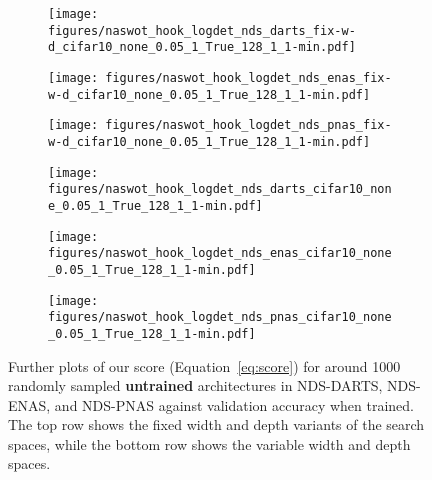 \documentclass{article}
\begin{document}
\begin{figure}[!b]
\vspace{-2cm}

    \centering
     \begin{subfigure}[b]{0.3\textwidth}
         \centering
         \texttt{[image: figures/naswot\_hook\_logdet\_nds\_darts\_fix-w-d\_cifar10\_none\_0.05\_1\_True\_128\_1\_1-min.pdf]}
         \caption{}
     \end{subfigure}
     \hfill
          \begin{subfigure}[b]{0.3\textwidth}
         \centering
         \texttt{[image: figures/naswot\_hook\_logdet\_nds\_enas\_fix-w-d\_cifar10\_none\_0.05\_1\_True\_128\_1\_1-min.pdf]}
         \caption{}
     \end{subfigure}
     \hfill
     \begin{subfigure}[b]{0.3\textwidth}
         \centering

         \texttt{[image: figures/naswot\_hook\_logdet\_nds\_pnas\_fix-w-d\_cifar10\_none\_0.05\_1\_True\_128\_1\_1-min.pdf]}
         \caption{}
     \end{subfigure}
    
     \hfill
     \vspace{-.5cm}
     

    \centering
     \begin{subfigure}[b]{0.3\textwidth}
         \centering
         \texttt{[image: figures/naswot\_hook\_logdet\_nds\_darts\_cifar10\_none\_0.05\_1\_True\_128\_1\_1-min.pdf]}
         \caption{}
     \end{subfigure}
     \hfill
          \begin{subfigure}[b]{0.3\textwidth}
         \centering
         \texttt{[image: figures/naswot\_hook\_logdet\_nds\_enas\_cifar10\_none\_0.05\_1\_True\_128\_1\_1-min.pdf]}
         \caption{}
     \end{subfigure}
     \hfill
     \begin{subfigure}[b]{0.3\textwidth}
         \centering
         \texttt{[image: figures/naswot\_hook\_logdet\_nds\_pnas\_cifar10\_none\_0.05\_1\_True\_128\_1\_1-min.pdf]}
         \caption{}
     \end{subfigure}
    
     \hfill
     
     \caption{Further plots of our score (Equation~\ref{eq:score}) for around 1000 randomly sampled {\bf untrained} architectures in 
   NDS-DARTS,
   NDS-ENAS, and
   NDS-PNAS 
   against validation accuracy when trained. The top row shows the fixed width and depth variants of the search spaces, while the bottom row shows the variable width and depth spaces.}
    \label{fig:extraplots-NDS} 
\end{figure}
\end{document}
